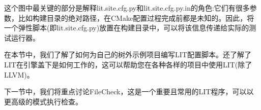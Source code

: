 这个图中最关键的部分是解释lit.site.cfg.py和lit.site.cfg.py.in的角色:它们有很多参数，比如构建目录的绝对路径，在CMake配置过程完成前都是未知的。因此，将一个弹性脚本(即lit.site.cfg.py)放置在构建目录中，可以将该信息传递给实际的测试运行器。

在本节中，我们了解了如何为自己的树外示例项目编写LIT配置脚本。还了解了LIT在引擎盖下是如何工作的，这可以帮助您在各种各样的项目中使用LIT(除了LLVM)。

下一节中，我们将重点讨论FileCheck，这是一个重要且常用的LIT程序，可以以更高级的模式执行检查。





